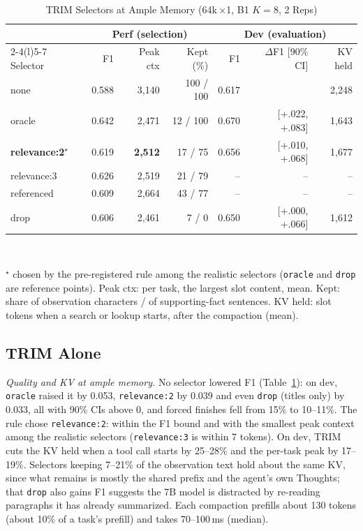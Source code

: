 \documentclass[conference]{IEEEtran}
\newcommand{\x}{$\times$}
\newcommand{\pick}{$^\star$}
\newcommand{\cfg}[1]{\texttt{#1}}
\begin{document}
\begin{table}[t]
  \caption{TRIM Selectors at Ample Memory (64k\,\x1, B1 $K{=}8$, 2 Reps)}
  \label{tab:sel}
  \centering
  \scriptsize
  \setlength{\tabcolsep}{2.2pt}
  \begin{tabular}{@{}lrrrrrr@{}}
    \toprule
     & \multicolumn{3}{c}{Perf (selection)} & \multicolumn{3}{c}{Dev (evaluation)} \\
    \cmidrule(lr){2-4}\cmidrule(l){5-7}
    Selector & F1 & Peak ctx & Kept (\%) & F1 & $\Delta$F1 [90\% CI] & KV held \\
    \midrule
    none & 0.588 & 3,140 & 100 / 100 & 0.617 & & 2,248 \\
    oracle & 0.642 & 2,471 & 12 / 100 & 0.670 & [+.022, +.083] & 1,643 \\
    \textbf{relevance:2}\pick & 0.619 & \textbf{2,512} & 17 / 75 & 0.656 & [+.010, +.068] & 1,677 \\
    relevance:3 & 0.626 & 2,519 & 21 / 79 & -- & -- & -- \\
    referenced & 0.609 & 2,664 & 43 / 77 & -- & -- & -- \\
    drop & 0.606 & 2,461 & 7 / 0 & 0.650 & [+.000, +.066] & 1,612 \\
    \bottomrule
  \end{tabular}\\[2pt]
  \parbox{\columnwidth}{\raggedright\scriptsize \pick{} chosen by the pre-registered rule among the
  realistic selectors (\cfg{oracle} and \cfg{drop} are reference points). Peak ctx: per task, the
  largest slot content, mean. Kept: share of observation characters / of supporting-fact sentences.
  KV held: slot tokens when a search or lookup starts, after the compaction (mean).}
\end{table}

\subsection{TRIM Alone}\label{sec:trimalone}
\emph{Quality and KV at ample memory.} No selector lowered F1 (Table~\ref{tab:sel}): on dev,
\cfg{oracle} raised it by 0.053, \cfg{relevance:2} by 0.039 and even \cfg{drop} (titles only) by 0.033,
all with 90\% CIs above 0, and forced finishes fell from 15\% to 10--11\%. The rule chose
\cfg{relevance:2}: within the F1 bound and with the smallest peak context among the realistic
selectors (\cfg{relevance:3} is within 7 tokens). On dev, TRIM cuts the KV held when a tool call
starts by 25--28\% and the per-task peak by 17--19\%. Selectors keeping 7--21\% of the observation text
hold about the same KV, since what remains is mostly the shared prefix and the agent's own Thoughts;
that \cfg{drop} also gains F1 suggests the 7B model is distracted by re-reading paragraphs it has
already summarized. Each compaction prefills about 130 tokens (about 10\% of a task's prefill) and
takes 70--100\,ms (median).
\end{document}
